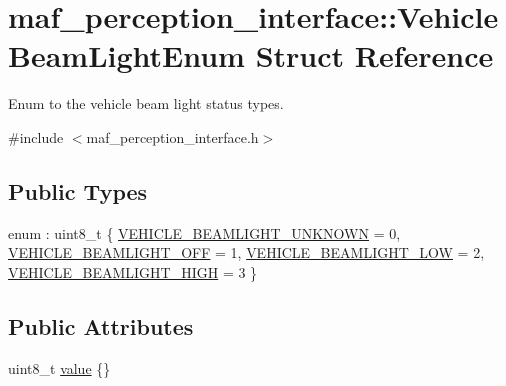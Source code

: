 \hypertarget{structmaf__perception__interface_1_1VehicleBeamLightEnum}{}\section{maf\+\_\+perception\+\_\+interface\+:\+:Vehicle\+Beam\+Light\+Enum Struct Reference}
\label{structmaf__perception__interface_1_1VehicleBeamLightEnum}


Enum to the vehicle beam light status types.  




{\ttfamily \#include $<$maf\+\_\+perception\+\_\+interface.\+h$>$}

\subsection*{Public Types}
\begin{DoxyCompactItemize}
\item 
enum \+: uint8\+\_\+t \{ \hyperlink{structmaf__perception__interface_1_1VehicleBeamLightEnum_aa25c98329c832e8f4df5438a14e514f5a0d83f282fa9430ae11d11f1a8d117be3}{V\+E\+H\+I\+C\+L\+E\+\_\+\+B\+E\+A\+M\+L\+I\+G\+H\+T\+\_\+\+U\+N\+K\+N\+O\+WN} = 0, 
\hyperlink{structmaf__perception__interface_1_1VehicleBeamLightEnum_aa25c98329c832e8f4df5438a14e514f5a9bedc9332cb8f165a6e954ae7f017239}{V\+E\+H\+I\+C\+L\+E\+\_\+\+B\+E\+A\+M\+L\+I\+G\+H\+T\+\_\+\+O\+FF} = 1, 
\hyperlink{structmaf__perception__interface_1_1VehicleBeamLightEnum_aa25c98329c832e8f4df5438a14e514f5a7e6cc6b6e457a8a2738dfef4b27271eb}{V\+E\+H\+I\+C\+L\+E\+\_\+\+B\+E\+A\+M\+L\+I\+G\+H\+T\+\_\+\+L\+OW} = 2, 
\hyperlink{structmaf__perception__interface_1_1VehicleBeamLightEnum_aa25c98329c832e8f4df5438a14e514f5a8c0fed619f66bca981435977b3a55d14}{V\+E\+H\+I\+C\+L\+E\+\_\+\+B\+E\+A\+M\+L\+I\+G\+H\+T\+\_\+\+H\+I\+GH} = 3
 \}
\end{DoxyCompactItemize}
\subsection*{Public Attributes}
\begin{DoxyCompactItemize}
\item 
uint8\+\_\+t \hyperlink{structmaf__perception__interface_1_1VehicleBeamLightEnum_a5d7c3b70d67e4f2e359f76587d4a9676}{value} \{\}
\end{DoxyCompactItemize}


